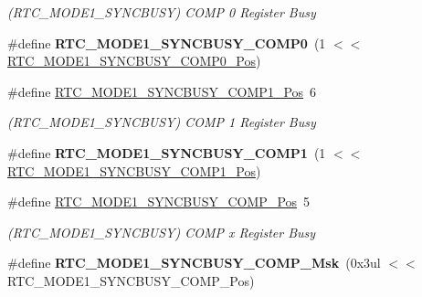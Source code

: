 \begin{DoxyCompactItemize}
\begin{DoxyCompactList}\small\item\em (R\+T\+C\+\_\+\+M\+O\+D\+E1\+\_\+\+S\+Y\+N\+C\+B\+U\+S\+Y) C\+O\+M\+P 0 Register Busy \end{DoxyCompactList}\item 
\hypertarget{group___s_a_m_l21___r_t_c_gad8586629b0a23dc11f30745fd44033a7}{}\#define {\bfseries R\+T\+C\+\_\+\+M\+O\+D\+E1\+\_\+\+S\+Y\+N\+C\+B\+U\+S\+Y\+\_\+\+C\+O\+M\+P0}~(1 $<$$<$ \hyperlink{group___s_a_m_l21___r_t_c_ga097883af41cbf9f9319b7834af159e58}{R\+T\+C\+\_\+\+M\+O\+D\+E1\+\_\+\+S\+Y\+N\+C\+B\+U\+S\+Y\+\_\+\+C\+O\+M\+P0\+\_\+\+Pos})\label{group___s_a_m_l21___r_t_c_gad8586629b0a23dc11f30745fd44033a7}

\item 
\hypertarget{group___s_a_m_l21___r_t_c_ga279c28dd8858350ef5554dba6161c972}{}\#define \hyperlink{group___s_a_m_l21___r_t_c_ga279c28dd8858350ef5554dba6161c972}{R\+T\+C\+\_\+\+M\+O\+D\+E1\+\_\+\+S\+Y\+N\+C\+B\+U\+S\+Y\+\_\+\+C\+O\+M\+P1\+\_\+\+Pos}~6\label{group___s_a_m_l21___r_t_c_ga279c28dd8858350ef5554dba6161c972}

\begin{DoxyCompactList}\small\item\em (R\+T\+C\+\_\+\+M\+O\+D\+E1\+\_\+\+S\+Y\+N\+C\+B\+U\+S\+Y) C\+O\+M\+P 1 Register Busy \end{DoxyCompactList}\item 
\hypertarget{group___s_a_m_l21___r_t_c_ga1c0a5ae4dae7d2d12d3f5f678bdf2298}{}\#define {\bfseries R\+T\+C\+\_\+\+M\+O\+D\+E1\+\_\+\+S\+Y\+N\+C\+B\+U\+S\+Y\+\_\+\+C\+O\+M\+P1}~(1 $<$$<$ \hyperlink{group___s_a_m_l21___r_t_c_ga279c28dd8858350ef5554dba6161c972}{R\+T\+C\+\_\+\+M\+O\+D\+E1\+\_\+\+S\+Y\+N\+C\+B\+U\+S\+Y\+\_\+\+C\+O\+M\+P1\+\_\+\+Pos})\label{group___s_a_m_l21___r_t_c_ga1c0a5ae4dae7d2d12d3f5f678bdf2298}

\item 
\hypertarget{group___s_a_m_l21___r_t_c_gacb6687afbd8536b9e2c06ad518621a2e}{}\#define \hyperlink{group___s_a_m_l21___r_t_c_gacb6687afbd8536b9e2c06ad518621a2e}{R\+T\+C\+\_\+\+M\+O\+D\+E1\+\_\+\+S\+Y\+N\+C\+B\+U\+S\+Y\+\_\+\+C\+O\+M\+P\+\_\+\+Pos}~5\label{group___s_a_m_l21___r_t_c_gacb6687afbd8536b9e2c06ad518621a2e}

\begin{DoxyCompactList}\small\item\em (R\+T\+C\+\_\+\+M\+O\+D\+E1\+\_\+\+S\+Y\+N\+C\+B\+U\+S\+Y) C\+O\+M\+P x Register Busy \end{DoxyCompactList}\item 
\hypertarget{group___s_a_m_l21___r_t_c_ga78f79d05071207bdc8a9c36c3992c771}{}\#define {\bfseries R\+T\+C\+\_\+\+M\+O\+D\+E1\+\_\+\+S\+Y\+N\+C\+B\+U\+S\+Y\+\_\+\+C\+O\+M\+P\+\_\+\+Msk}~(0x3ul $<$$<$ R\+T\+C\+\_\+\+M\+O\+D\+E1\+\_\+\+S\+Y\+N\+C\+B\+U\+S\+Y\+\_\+\+C\+O\+M\+P\+\_\+\+Pos)\label{group___s_a_m_l21___r_t_c_ga78f79d05071207bdc8a9c36c3992c771}


\end{DoxyCompactItemize}
